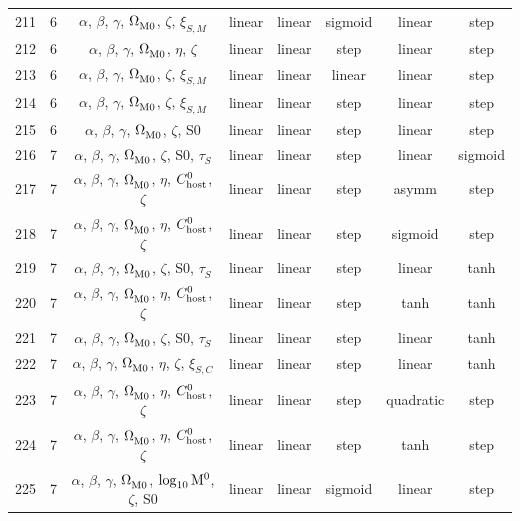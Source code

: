\begin{longtable}{c c c c c c c c}
    211 & 6 & $\alpha$, $\beta$, $\gamma$, $\Omega_{\rm M0}^{}$, $\zeta$, $\xi_{S,M}^{}$ & linear & linear & sigmoid & linear & step \\
    212 & 6 & $\alpha$, $\beta$, $\gamma$, $\Omega_{\rm M0}^{}$, $\eta$, $\zeta$ & linear & linear & step & linear & step \\
    213 & 6 & $\alpha$, $\beta$, $\gamma$, $\Omega_{\rm M0}^{}$, $\zeta$, $\xi_{S,M}^{}$ & linear & linear & linear & linear & step \\
    214 & 6 & $\alpha$, $\beta$, $\gamma$, $\Omega_{\rm M0}^{}$, $\zeta$, $\xi_{S,M}^{}$ & linear & linear & step & linear & step \\
    215 & 6 & $\alpha$, $\beta$, $\gamma$, $\Omega_{\rm M0}^{}$, $\zeta$, S0 & linear & linear & step & linear & step \\
    216 & 7 & $\alpha$, $\beta$, $\gamma$, $\Omega_{\rm M0}^{}$, $\zeta$, S0, $\tau_S^{}$ & linear & linear & step & linear & sigmoid \\
    217 & 7 & $\alpha$, $\beta$, $\gamma$, $\Omega_{\rm M0}^{}$, $\eta$, $C_{\rm host}^{0}$, $\zeta$ & linear & linear & step & asymm & step \\
    218 & 7 & $\alpha$, $\beta$, $\gamma$, $\Omega_{\rm M0}^{}$, $\eta$, $C_{\rm host}^{0}$, $\zeta$ & linear & linear & step & sigmoid & step \\
    219 & 7 & $\alpha$, $\beta$, $\gamma$, $\Omega_{\rm M0}^{}$, $\zeta$, S0, $\tau_S^{}$ & linear & linear & step & linear & tanh \\
    220 & 7 & $\alpha$, $\beta$, $\gamma$, $\Omega_{\rm M0}^{}$, $\eta$, $C_{\rm host}^{0}$, $\zeta$ & linear & linear & step & tanh & tanh \\
    221 & 7 & $\alpha$, $\beta$, $\gamma$, $\Omega_{\rm M0}^{}$, $\zeta$, S0, $\tau_S^{}$ & linear & linear & step & linear & tanh \\
    222 & 7 & $\alpha$, $\beta$, $\gamma$, $\Omega_{\rm M0}^{}$, $\eta$, $\zeta$, $\xi_{S,C}^{}$ & linear & linear & step & linear & tanh \\
    223 & 7 & $\alpha$, $\beta$, $\gamma$, $\Omega_{\rm M0}^{}$, $\eta$, $C_{\rm host}^{0}$, $\zeta$ & linear & linear & step & quadratic & step \\
    224 & 7 & $\alpha$, $\beta$, $\gamma$, $\Omega_{\rm M0}^{}$, $\eta$, $C_{\rm host}^{0}$, $\zeta$ & linear & linear & step & tanh & step \\
    225 & 7 & $\alpha$, $\beta$, $\gamma$, $\Omega_{\rm M0}^{}$, $\log_{10}^{}{\rm M}^0$, $\zeta$, S0 & linear & linear & sigmoid & linear & step \\

\end{longtable}
